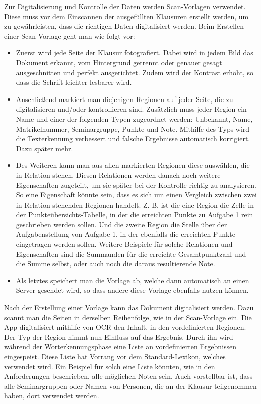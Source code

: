 \documentclass[nomenclature, 150]{HSMW-Thesis}
\begin{document}
	Zur Digitalisierung und Kontrolle der Daten werden Scan-Vorlagen verwendet. Diese muss vor dem Einscannen der ausgefüllten Klausuren erstellt werden, um zu gewährleisten, dass die richtigen Daten digitalisiert werden. Beim Erstellen einer Scan-Vorlage geht man wie folgt vor:
	\begin{itemize}
		\item Zuerst wird jede Seite der Klausur fotografiert. Dabei wird in jedem Bild das Dokument erkannt, vom Hintergrund getrennt oder genauer gesagt ausgeschnitten und perfekt ausgerichtet. Zudem wird der Kontrast erhöht, so dass die Schrift leichter lesbarer wird.
		\item Anschließend markiert man diejenigen Regionen auf jeder Seite, die zu digitalisieren und/oder kontrollieren sind. Zusätzlich muss jeder Region ein Name und einer der folgenden Typen zugeordnet werden: Unbekannt, Name, Matrikelnummer, Seminargruppe, Punkte und Note. Mithilfe des Typs wird die Texterkennung verbessert und falsche Ergebnisse automatisch korrigiert. Dazu später mehr.
		\item Des Weiteren kann man aus allen markierten Regionen diese auswählen, die in Relation stehen. Diesen Relationen werden danach noch weitere Eigenschaften zugeteilt, um sie später bei der Kontrolle richtig zu analysieren. So eine Eigenschaft könnte sein, dass es sich um einen Vergleich zwischen zwei in Relation stehenden Regionen handelt. Z. B. ist die eine Region die Zelle in der Punkteübersichts-Tabelle, in der die erreichten Punkte zu Aufgabe 1 rein geschrieben werden sollen. Und die zweite Region die Stelle über der Aufgabenstellung von Aufgabe 1, in der ebenfalls die erreichten Punkte eingetragen werden sollen. Weitere Beispiele für solche Relationen und Eigenschaften sind die Summanden für die erreichte Gesamtpunktzahl und die Summe selbst, oder auch noch die daraus resultierende Note.
		\item Als letztes speichert man die Vorlage ab, welche dann automatisch an einen Server gesendet wird, so dass andere diese Vorlage ebenfalls nutzen können.
	\end{itemize}
	
	Nach der Erstellung einer Vorlage kann das Dokument digitalisiert werden. Dazu scannt man die Seiten in derselben Reihenfolge, wie in der Scan-Vorlage ein. Die App digitalisiert mithilfe von OCR den Inhalt, in den vordefinierten Regionen. Der Typ der Region nimmt nun Einfluss auf das Ergebnis. Durch ihn wird während der Worterkennungsphase eine Liste an vordefinierten Ergebnissen eingespeist. Diese Liste hat Vorrang vor dem Standard-Lexikon, welches verwendet wird. Ein Beispiel für solch eine Liste könnten, wie in den Anforderungen beschrieben, alle möglichen Noten sein. Auch vorstellbar ist, dass alle Seminargruppen oder Namen von Personen, die an der Klausur teilgenommen haben, dort verwendet werden. 
	
\end{document}
